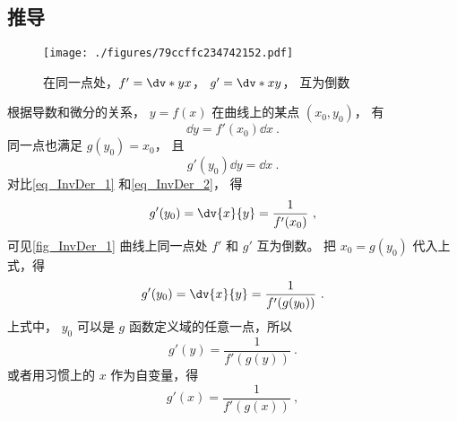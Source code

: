\subsection{推导}
\begin{figure}[ht]
\centering
\texttt{[image: ./figures/79ccffc234742152.pdf]}
\caption{在同一点处，$f'=\dv*{y}{x}$， $g'=\dv*{x}{y}$， 互为倒数}\label{fig_InvDer_1}
\end{figure}
根据导数和微分的关系， $y = f(x)$ 在曲线上的某点 $(x_0, y_0)$， 有
 \begin{equation}\label{eq_InvDer_1}
\dd{y} = f'(x_0) \dd{x}~.
\end{equation}
同一点也满足 $g(y_0) = x_0$， 且
 \begin{equation}\label{eq_InvDer_2}
g'(y_0)\dd{y} = \dd{x}~.
\end{equation}
对比\autoref{eq_InvDer_1} 和\autoref{eq_InvDer_2}， 得
\begin{equation}
g'(y_0) = \dv{x}{y} = \frac{1}{f'(x_0)}~,
\end{equation}
可见\autoref{fig_InvDer_1} 曲线上同一点处 $f'$ 和 $g'$ 互为倒数。 把 ${x_0} = g(y_0)$ 代入上式，得
\begin{equation}
g'(y_0) = \dv{x}{y} = \frac{1}{f'(g(y_0))}~.
\end{equation} 
上式中， $y_0$ 可以是 $g$ 函数定义域的任意一点，所以
\begin{equation}
g'(y) = \frac{1}{f'(g(y))}~.
\end{equation} 
或者用习惯上的 $x$ 作为自变量，得
\begin{equation}
g'(x) = \frac{1}{f'(g(x))}~,
\end{equation}
